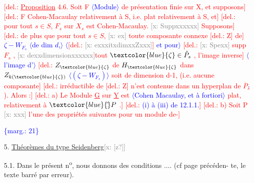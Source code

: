 \documentclass[11pt]{article}
\newcommand{\scanpage}[1]{\par\bigskip\noindent{\small\sffamily[scan #1]}\par}
\newcommand{\mspage}[1]{{\small\sffamily[p.\,#1]}}
\newcommand{\hand}[1]{\textcolor{blue}{#1}}
\newcommand{\inserted}[2][]{\textcolor{blue}{$\langle$#2$\rangle$}}
\newcommand{\margin}[1]{\textcolor{blue}{\{\textsf{marg.:} #1\}}}
\newcommand{\deleted}[1]{\textcolor{red}{[\textsf{del.:} #1]}}
\newcommand{\xout}[1]{\textcolor{gray}{[\textsf{x:} #1]}}
\newcommand{\uline}[1]{\underline{#1}}
\newcommand{\unsure}[1]{[#1?]}
\begin{document}
\deleted{\uline{Proposition} 4.6. Soit F \inserted[typed]{Module} de présentation finie sur X, et supposons}
\deleted{F Cohen-Macaulay relativement à S, i.e. plat relativement à S, et}
\deleted{pour tout $s \in S$, $F_s$ sur $X_s$ est Cohen-Macaulay. \xout{Suppxxxxxx} Supposons}
\deleted{de plus que pour tout $s \in S$, \xout{ex} toute composante connexe \deleted{Z} de} \hand{$\zeta - W_{F_s}$}
\inserted{de dim $d$,} \inserted[typed]{\deleted{\xout{exxxitxdimxxZxxx}} et pour}
\deleted{\xout{Spexx} supp $F_s$ , \xout{dexxdimensionxxxxxx}tout $\hand{\zeta} \in \check{P}_s$ , l'image inverse}
\inserted[typed]{l'image d'}
\deleted{$Z_{\hand{\zeta}}$ de $H_{\hand{\zeta}}$ dans $Z_{k(\hand{\zeta})}$ \inserted{$(\zeta - W_{F_s})$} soit de dimension d-1, (i.e. aucune composante}
\deleted{irréductible de \deleted{Z} n'est contenue dans un hyperplan de $\overline{P}_s$\hand{$\check{}$} ). Alors :}
\deleted{a) Le Module \underline{G} sur \underline{Y} est \inserted{Cohen Macaulay, et à fortiori} plat, relativement à $\hand{\check{}}P$ .}
\deleted{\hand{(i) à (iii) de 12.1.1.}}
\deleted{b) Soit P \xout{xxx} l'une des propriétés suivantes pour un module de-}

\margin{21}

\clearpage
\scanpage{25/22}
\mspage{\hand{19}}

5. \uline{Th\'eor\`emes du type Seidenberg}\xout{\unsure{z}}

5.1.
Dans le pr\'esent n\textsuperscript{o}, nous donnons des conditions .... (cf page pr\'ec\'eden-%
te, le texte barr\'e par erreur).
\end{document}
